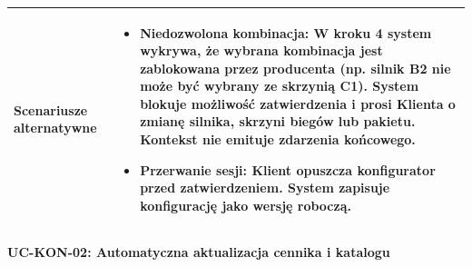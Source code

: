\begin{longtable}{|p{4cm}|p{11cm}|}
Scenariusze alternatywne & 
\begin{itemize}
    \item [A1] Niedozwolona kombinacja: W kroku 4 system wykrywa, że wybrana kombinacja jest zablokowana przez producenta (np. silnik B2 nie może być wybrany ze skrzynią C1). System blokuje możliwość zatwierdzenia i prosi Klienta o zmianę silnika, skrzyni biegów lub pakietu. Kontekst nie emituje zdarzenia końcowego.
    \item [A2] Przerwanie sesji: Klient opuszcza konfigurator przed zatwierdzeniem. System zapisuje konfigurację jako wersję roboczą.
\end{itemize} \\
\hline
\end{longtable}

\textbf{UC-KON-02: Automatyczna aktualizacja cennika i katalogu}

